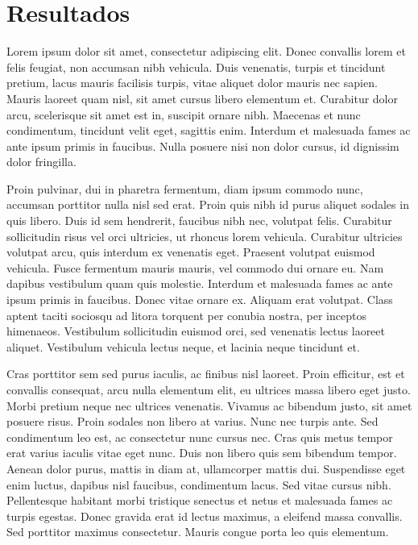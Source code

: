 \section{Resultados}



Lorem ipsum dolor sit amet, consectetur adipiscing elit. Donec convallis lorem et felis feugiat, non accumsan nibh vehicula. Duis venenatis, turpis et tincidunt pretium, lacus mauris facilisis turpis, vitae aliquet dolor mauris nec sapien. Mauris laoreet quam nisl, sit amet cursus libero elementum et. Curabitur dolor arcu, scelerisque sit amet est in, suscipit ornare nibh. Maecenas et nunc condimentum, tincidunt velit eget, sagittis enim. Interdum et malesuada fames ac ante ipsum primis in faucibus. Nulla posuere nisi non dolor cursus, id dignissim dolor fringilla.

Proin pulvinar, dui in pharetra fermentum, diam ipsum commodo nunc, accumsan porttitor nulla nisl sed erat. Proin quis nibh id purus aliquet sodales in quis libero. Duis id sem hendrerit, faucibus nibh nec, volutpat felis. Curabitur sollicitudin risus vel orci ultricies, ut rhoncus lorem vehicula. Curabitur ultricies volutpat arcu, quis interdum ex venenatis eget. Praesent volutpat euismod vehicula. Fusce fermentum mauris mauris, vel commodo dui ornare eu. Nam dapibus vestibulum quam quis molestie. Interdum et malesuada fames ac ante ipsum primis in faucibus. Donec vitae ornare ex. Aliquam erat volutpat. Class aptent taciti sociosqu ad litora torquent per conubia nostra, per inceptos himenaeos. Vestibulum sollicitudin euismod orci, sed venenatis lectus laoreet aliquet. Vestibulum vehicula lectus neque, et lacinia neque tincidunt et.

Cras porttitor sem sed purus iaculis, ac finibus nisl laoreet. Proin efficitur, est et convallis consequat, arcu nulla elementum elit, eu ultrices massa libero eget justo. Morbi pretium neque nec ultrices venenatis. Vivamus ac bibendum justo, sit amet posuere risus. Proin sodales non libero at varius. Nunc nec turpis ante. Sed condimentum leo est, ac consectetur nunc cursus nec. Cras quis metus tempor erat varius iaculis vitae eget nunc. Duis non libero quis sem bibendum tempor. Aenean dolor purus, mattis in diam at, ullamcorper mattis dui. Suspendisse eget enim luctus, dapibus nisl faucibus, condimentum lacus. Sed vitae cursus nibh. Pellentesque habitant morbi tristique senectus et netus et malesuada fames ac turpis egestas. Donec gravida erat id lectus maximus, a eleifend massa convallis. Sed porttitor maximus consectetur. Mauris congue porta leo quis elementum.

